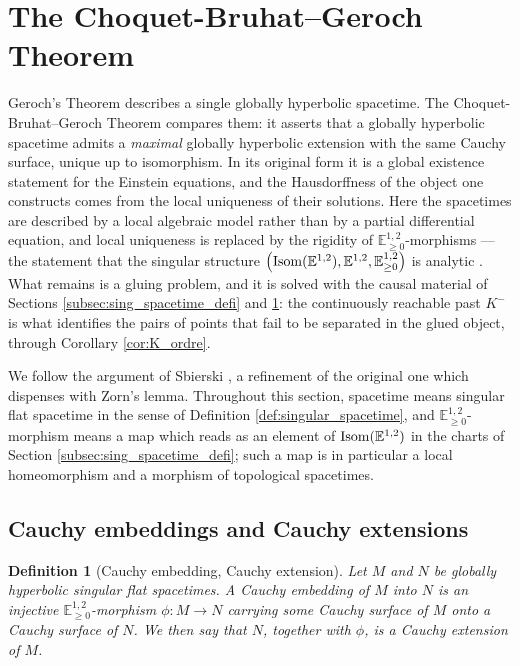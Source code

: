\documentclass[a4paper,twoside]{article}
\newcommand{\mass}[1]{\mathbb{E}^{1,2}_{#1}}
\newtheorem{defi}[lem]{Definition}
\begin{document}
\section{The Choquet-Bruhat--Geroch Theorem}\label{sec:CBG}

Geroch's Theorem describes a single globally hyperbolic spacetime. The Choquet-Bruhat--Geroch
Theorem \cite{MR0250640} compares them: it asserts that a globally hyperbolic spacetime admits a
\emph{maximal} globally hyperbolic extension with the same Cauchy surface, unique up to isomorphism.
In its original form it is a global existence statement for the Einstein equations, and the
Hausdorffness of the object one constructs comes from the local uniqueness of their solutions. Here
the spacetimes are described by a local algebraic model rather than by a partial differential
equation, and local uniqueness is replaced by the rigidity of $\mass{\geq0}$-morphisms --- the
statement that the singular structure $\left(\isom(\mass{}),\mass{},\mass{\geq0}\right)$ is analytic
\cite[Section~2.3]{thesis}. What remains is a gluing problem, and it is solved with the causal
material of Sections \ref{subsec:sing_spacetime_defi} and \ref{sec:CBG}: the continuously reachable
past $K^-$ is what identifies the pairs of points that fail to be separated in the glued object,
through Corollary \ref{cor:K_ordre}.

We follow the argument of Sbierski \cite{sbierski_geroch}, a refinement of the original one which
dispenses with Zorn's lemma. Throughout this section, spacetime means singular flat spacetime in the
sense of Definition \ref{def:singular_spacetime}, and $\mass{\geq0}$-morphism means a map which reads
as an element of $\isom(\mass{})$ in the charts of Section \ref{subsec:sing_spacetime_defi}; such a
map is in particular a local homeomorphism and a morphism of topological spacetimes.

\subsection{Cauchy embeddings and Cauchy extensions}

\begin{defi}[Cauchy embedding, Cauchy extension]
Let $M$ and $N$ be globally hyperbolic singular flat spacetimes. A \emph{Cauchy embedding} of $M$
into $N$ is an injective $\mass{\geq0}$-morphism $\phi:M\rightarrow N$ carrying some Cauchy surface
of $M$ onto a Cauchy surface of $N$. We then say that $N$, together with $\phi$, is a \emph{Cauchy
extension} of $M$.
\end{defi}
\end{document}
